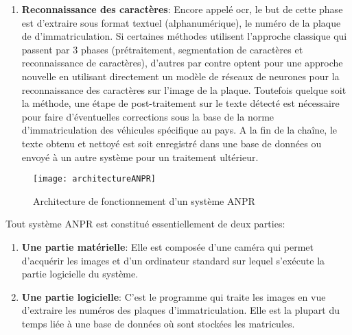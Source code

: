 \begin{enumerate}
    \item \textbf{Reconnaissance des caractères}: Encore appelé \acrshort{ocr}, le but de cette phase est d’extraire sous format textuel (alphanumérique), le numéro de la plaque de d’immatriculation. Si certaines méthodes \cite{krimMaster, 10.1155/2018/6737314} utilisent l'approche classique qui passent par 3 phases (prétraitement, segmentation de caractères et reconnaissance de caractères), d’autres \cite{Alahyane2021OpenDF, doi:10.1177/0361198120954202} par contre optent pour une approche nouvelle en utilisant directement un modèle de réseaux de neurones pour la reconnaissance des caractères sur l'image de la plaque. Toutefois quelque soit la méthode, une étape de post-traitement sur le texte détecté est nécessaire pour faire d'éventuelles corrections sous la base de la norme d’immatriculation des véhicules spécifique au pays. A la fin de la chaîne, le texte obtenu et nettoyé est soit enregistré dans une base de données ou envoyé à un autre système pour un traitement ultérieur.

\end{enumerate}

\begin{figure}[H]
    \centering
    \texttt{[image: architectureANPR]}
    \caption{Architecture de fonctionnement d'un système ANPR}
\end{figure}
Tout système ANPR est constitué essentiellement de deux parties:
    \begin{enumerate}
        \item \textbf{Une partie matérielle}: Elle est composée d’une caméra qui permet d’acquérir les images et d’un ordinateur standard sur lequel s'exécute la partie logicielle du système.
        \item \textbf{Une partie logicielle}: C’est le programme qui traite les images en vue d’extraire les numéros des plaques d’immatriculation. Elle est la plupart du temps liée à une base de données où sont stockées les matricules.
    \end{enumerate}